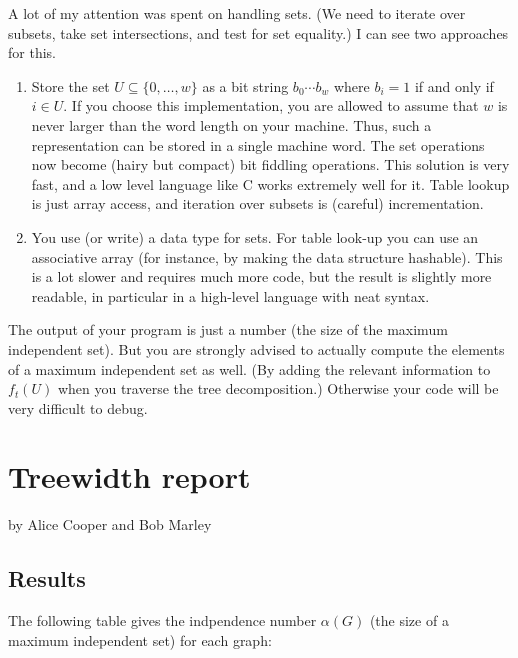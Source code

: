 \documentclass{tufte-handout}
\begin{document}
A lot of my attention was spent on handling sets.
(We need to iterate over subsets, take set intersections, and test for set equality.)
I can see two approaches for this.
\begin{enumerate}
  \item Store the set $U\subseteq \{0,\ldots,w\}$ as a bit string $b_0\cdots b_w$ where $b_i=1$ if and only if $i\in U$.
    If you choose this implementation, you are allowed to assume that $w$ is never larger than the word length on your machine.
    Thus, such a representation can be stored in a single machine word.
    The set operations now become (hairy but compact) bit fiddling operations.
    This solution is very fast, and a low level language like C works extremely well for it.
    Table lookup is just array access, and iteration over subsets is (careful) incrementation.
  \item You use (or write) a data type for sets.
    For table look-up you can use an associative array (for instance, by making the data structure hashable).
      This is a lot slower and requires much more code, but the result is slightly more readable, in particular in a high-level language with neat syntax.
\end{enumerate}

The output of your program is just a number (the size of the maximum independent set).
But you are strongly advised to actually compute the elements of a maximum independent set as well.
(By adding the relevant information to $f_t(U)$ when you traverse the tree decomposition.)
Otherwise your code will be very difficult to debug.

\newpage
\section{Treewidth report}


by Alice Cooper and Bob Marley


\subsection{Results}

The following table gives the indpendence number $\alpha(G)$ (the size of a maximum independent set) for each graph:
\end{document}
